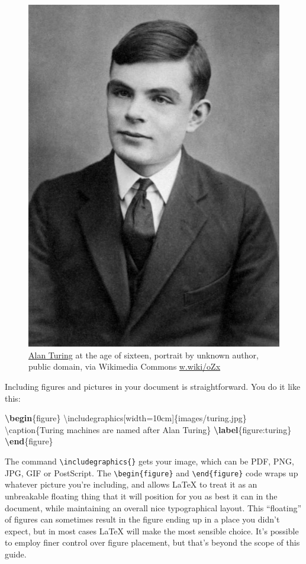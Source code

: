 \documentclass[
]{book}
\newenvironment{Shaded}{\begin{snugshade}}{\end{snugshade}}
\newcommand{\BuiltInTok}[1]{#1}
\newcommand{\ExtensionTok}[1]{#1}
\newcommand{\FunctionTok}[1]{\textcolor[rgb]{0.00,0.00,0.00}{#1}}
\newcommand{\KeywordTok}[1]{\textcolor[rgb]{0.13,0.29,0.53}{\textbf{#1}}}
\newcommand{\NormalTok}[1]{#1}
\begin{document}
\begin{figure}

{\centering \includegraphics[width=0.4\linewidth]{images/Alan_Turing_Aged_16} 

}

\caption{\href{https://en.wikipedia.org/wiki/Alan_Turing}{Alan Turing} at the age of sixteen, portrait by unknown author, public domain, via Wikimedia Commons \href{https://w.wiki/oZx}{w.wiki/oZx}}\label{fig:turing-fig}
\end{figure}



Including figures and pictures in your document is straightforward. You do it like this:

\begin{Shaded}
\begin{Highlighting}[]
\KeywordTok{\textbackslash{}begin}\NormalTok{\{}\ExtensionTok{figure}\NormalTok{\}}
\BuiltInTok{\textbackslash{}includegraphics}\NormalTok{[width=10cm]\{}\ExtensionTok{images/turing.jpg}\NormalTok{\}}
\FunctionTok{\textbackslash{}caption}\NormalTok{\{Turing machines are named after Alan Turing\}}
\KeywordTok{\textbackslash{}label}\NormalTok{\{}\ExtensionTok{figure:turing}\NormalTok{\}}
\KeywordTok{\textbackslash{}end}\NormalTok{\{}\ExtensionTok{figure}\NormalTok{\}}
\end{Highlighting}
\end{Shaded}

The command \texttt{\textbackslash{}includegraphics\{\}} gets your image, which can be PDF, PNG, JPG, GIF or PostScript. The \texttt{\textbackslash{}begin\{figure\}} and \texttt{\textbackslash{}end\{figure\}} code wraps up whatever picture you're including, and allows LaTeX to treat it as an unbreakable floating thing that it will position for you as best it can in the document, while maintaining an overall nice typographical layout. This ``floating'' of figures can sometimes result in the figure ending up in a place you didn't expect, but in most cases LaTeX will make the most sensible choice. It's possible to employ finer control over figure placement, but that's beyond the scope of this guide.
\end{document}
